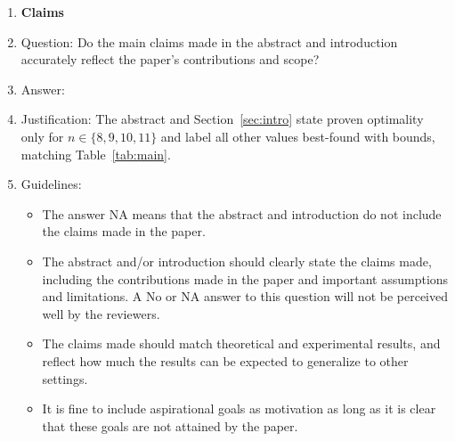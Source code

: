 \documentclass{article}
\begin{document}

\begin{enumerate}

\item {\bf Claims}
    \item[] Question: Do the main claims made in the abstract and introduction accurately reflect the paper's contributions and scope?
    \item[] Answer: \answerYes{}
    \item[] Justification: The abstract and Section~\ref{sec:intro} state proven optimality only for $n\in\{8,9,10,11\}$ and label all other values best-found with bounds, matching Table~\ref{tab:main}.
    \item[] Guidelines:
    \begin{itemize}
        \item The answer NA means that the abstract and introduction do not include the claims made in the paper.
        \item The abstract and/or introduction should clearly state the claims made, including the contributions made in the paper and important assumptions and limitations. A No or NA answer to this question will not be perceived well by the reviewers.
        \item The claims made should match theoretical and experimental results, and reflect how much the results can be expected to generalize to other settings.
        \item It is fine to include aspirational goals as motivation as long as it is clear that these goals are not attained by the paper.
    \end{itemize}


\end{enumerate}
\end{document}
